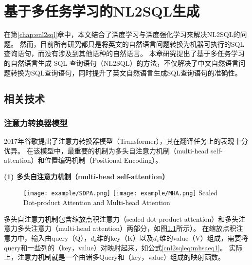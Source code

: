 
\chapter{基于多任务学习的NL2SQL生成}
\label{chap:cnl2sql}
在第\ref{chap:enl2sql}章中，本文结合了深度学习与深度强化学习来解决NL2SQL的问题。
然而，目前所有研究都只是将英文的自然语言问题转换为机器可执行的SQL查询语句，而没有涉及到其他语种的自然语言。
本章研究提出了基于多任务学习的自然语言生成 SQL 查询语句（NL2SQL）的方法，不仅解决了中文自然语言问题转换为SQL查询语句，同时提升了英文自然语言生成SQL查询语句的准确性。


\section{相关技术}
\subsection{注意力转换器模型}

2017年谷歌提出了注意力转换器模型（Transformer）\cite{vaswani2017attention}，其在翻译任务上的表现十分优异。
在该模型中，最重要的机制为多头自注意力机制（multi-head self-attention）和位置编码机制（Positional Encoding）。

\textbf{(1) 多头自注意力机制（multi-head self-attention）}

\begin{figure}[!htp]
  \centering
  \texttt{[image: example/SDPA.png]}
  \texttt{[image: example/MHA.png]}
    {Scaled Dot-product Attention and Multi-head Attention}
  \label{fig:SDPAMHA}
\end{figure}

多头自注意力机制包含缩放点积注意力（scaled dot-product attention）和多头注意力多头注意力（multi-head attention）两部分，如图\ref{fig:SDPAMHA}所示）。
在缩放点积注意力中，输入由query（Q），$d_k$维的key（K）以及$d_v$维的value（V）组成，需要将query和一些列的（key，value）对映射起来，如公式\ref{cnl2sqleq:mhsaeq1}。
实际上，注意力机制就是一个由诸多Query和（key，value）组成的映射函数。

